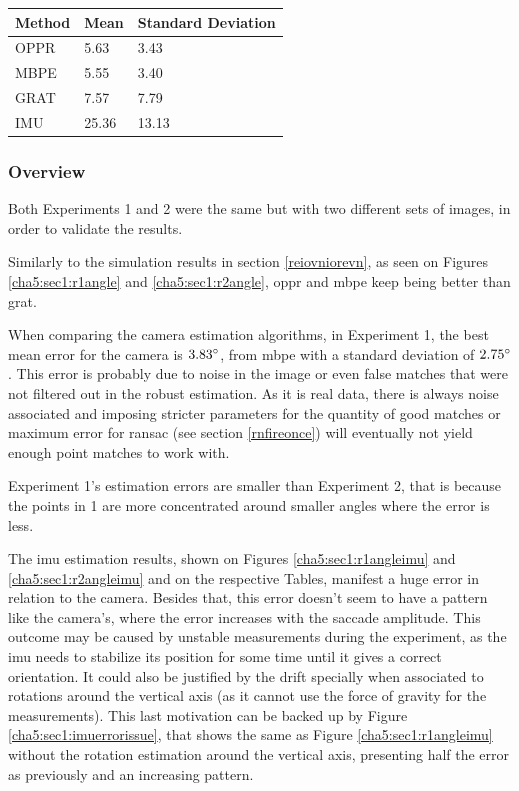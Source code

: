 \begin{table}
	\centering
	\begin{tabular}{| l | l | l |}
		\hline
		Method & Mean & Standard Deviation \\
		\hline
		OPPR &  5.63 \degree & 3.43 \degree \\
		\hline
		MBPE &  5.55 \degree & 3.40 \degree \\
		\hline
		GRAT &  7.57 \degree & 7.79 \degree \\ 
		\hline
		IMU &  25.36 \degree & 13.13 \degree \\ 
		\hline
	\end{tabular}
	\label{cha5:sec1:r2anglet}
\end{table}

\subsubsection{Overview}

Both Experiments 1 and 2 were the same but with two different sets of images, in order to validate the results.

Similarly to the simulation results in section \ref{reiovniorevn}, as seen on Figures \ref{cha5:sec1:r1angle} and \ref{cha5:sec1:r2angle}, \acrshort{oppr} and \acrshort{mbpe} keep being better than \acrshort{grat}.

When comparing the camera estimation algorithms, in Experiment 1, the best mean error for the camera is $3.83 \degree $, from \acrshort{mbpe} with a standard deviation of $2.75 \degree$. This error is probably due to noise in the image or even false matches that were not filtered out in the robust estimation. As it is real data, there is always noise associated and imposing stricter parameters for the quantity of good matches or maximum error for \acrshort{ransac} (see section \ref{rnfireonce}) will eventually not yield enough point matches to work with.

Experiment 1's estimation errors are smaller than Experiment 2, that is because the points in 1 are more concentrated around smaller angles where the error is less.

The \acrshort{imu} estimation results, shown on Figures \ref{cha5:sec1:r1angleimu} and \ref{cha5:sec1:r2angleimu} and on the respective Tables, manifest a huge error in relation to the camera. Besides that, this error doesn't seem to have a pattern like the camera's, where the error increases with the saccade amplitude. This outcome may be caused by unstable measurements during the experiment, as the \acrshort{imu} needs to stabilize its position for some time until it gives a correct orientation. It could also be justified by the drift specially when associated to rotations around the vertical axis (as it cannot use the force of gravity for the measurements). This last motivation can be backed up by Figure \ref{cha5:sec1:imuerrorissue}, that shows the same as Figure \ref{cha5:sec1:r1angleimu} without the rotation estimation around the vertical axis, presenting half the error as previously and an increasing pattern.


